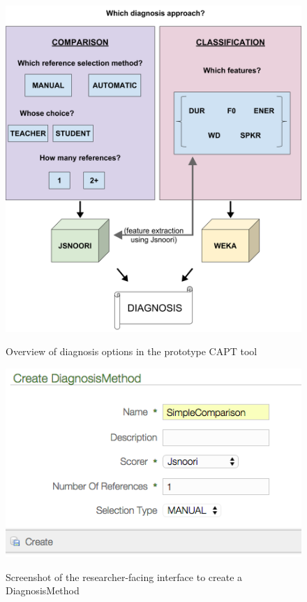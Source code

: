 	\begin{figure}
		\centering
		\caption[Overview of diagnosis options]{Overview of diagnosis options in the prototype CAPT tool }
		\includegraphics[width=\textwidth]{img/DiagnosisMethod}
		\label{fig:diag:system}
	\end{figure}
	
	\begin{figure}
		\centering
		\caption[Creating a DiagnosisMethod]{Screenshot of the researcher-facing interface to create a DiagnosisMethod}
		\includegraphics[width=\textwidth]{img/screenshots/createDiagnosisMethod}
		\label{fig:diag:creatediagnosismethod}
	\end{figure}
	
